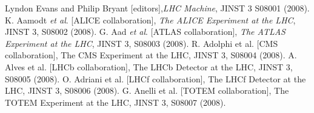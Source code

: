 \begin{thebibliography}{99}
 Lyndon Evans and Philip Bryant [editors],{\it LHC Machine}, JINST 3 S08001 (2008).
 K. Aamodt {\it et al}. [ALICE collaboration], {\it The ALICE Experiment at the LHC}, JINST 3,
S08002 (2008).
G. Aad {\it et al}. [ATLAS collaboration], {\it The ATLAS Experiment at the LHC}, JINST 3,
S08003 (2008).
R. Adolphi et al. [CMS collaboration], The CMS Experiment at the LHC, JINST 3, S08004
(2008).
A. Alves et al. [LHCb collaboration], The LHCb Detector at the LHC, JINST 3, S08005
(2008).
O. Adriani et al. [LHCf collaboration], The LHCf Detector at the LHC, JINST 3, S08006
(2008).
G. Anelli et al. [TOTEM collaboration], The TOTEM Experiment at the LHC, JINST 3,
S08007 (2008).


\end{thebibliography}
